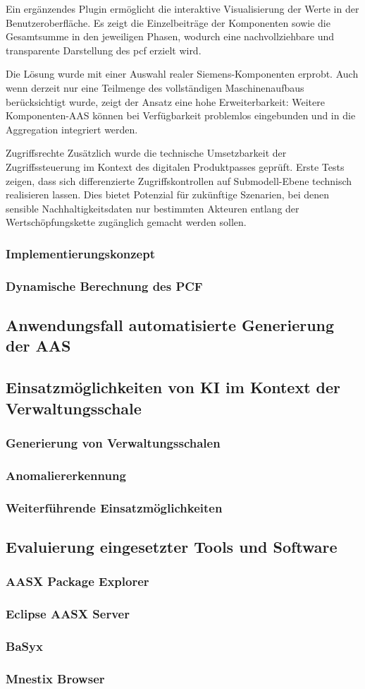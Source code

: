 Ein ergänzendes Plugin ermöglicht die interaktive Visualisierung der Werte in der Benutzeroberfläche. Es zeigt die Einzelbeiträge der Komponenten sowie die Gesamtsumme in den jeweiligen Phasen, wodurch eine nachvollziehbare und transparente Darstellung des \acs{pcf} erzielt wird.

Die Lösung wurde mit einer Auswahl realer Siemens-Komponenten erprobt. Auch wenn derzeit nur eine Teilmenge des vollständigen Maschinenaufbaus berücksichtigt wurde, zeigt der Ansatz eine hohe Erweiterbarkeit: Weitere Komponenten-AAS können bei Verfügbarkeit problemlos eingebunden und in die Aggregation integriert werden.

Zugriffsrechte
Zusätzlich wurde die technische Umsetzbarkeit der Zugriffssteuerung im Kontext des digitalen Produktpasses geprüft. Erste Tests zeigen, dass sich differenzierte Zugriffskontrollen auf Submodell-Ebene technisch realisieren lassen. Dies bietet Potenzial für zukünftige Szenarien, bei denen sensible Nachhaltigkeitsdaten nur bestimmten Akteuren entlang der Wertschöpfungskette zugänglich gemacht werden sollen.
\subsubsection{Implementierungskonzept}
\subsubsection{Dynamische Berechnung des PCF}
\subsection{Anwendungsfall automatisierte Generierung der AAS}
\subsection{Einsatzmöglichkeiten von KI im Kontext der Verwaltungsschale}
\subsubsection{Generierung von Verwaltungsschalen}
\subsubsection{Anomaliererkennung}
\subsubsection{Weiterführende Einsatzmöglichkeiten}
\subsection{Evaluierung eingesetzter Tools und Software}
\subsubsection{AASX Package Explorer}
\subsubsection{Eclipse AASX Server}
\subsubsection{BaSyx}
\subsubsection{Mnestix Browser}